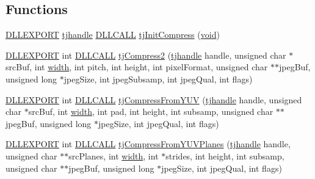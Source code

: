 \subsection*{Functions}
\begin{DoxyCompactItemize}
\item 
\hyperlink{turbojpeg_8h_a808e08638be3cba36e36759e5b150de0}{D\+L\+L\+E\+X\+P\+O\+RT} \hyperlink{group___turbo_j_p_e_g_ga758d2634ecb4949de7815cba621f5763}{tjhandle} \hyperlink{turbojpeg_8h_a54b25836118bfac94a53a7b790f3ccb2}{D\+L\+L\+C\+A\+LL} \hyperlink{group___turbo_j_p_e_g_ga3d10c47fbe4a2489a2b30c931551d01a}{tj\+Init\+Compress} (\hyperlink{png_8h_ac9c84fa68bbad002983e35ce3663c686}{void})
\item 
\hyperlink{turbojpeg_8h_a808e08638be3cba36e36759e5b150de0}{D\+L\+L\+E\+X\+P\+O\+RT} int \hyperlink{turbojpeg_8h_a54b25836118bfac94a53a7b790f3ccb2}{D\+L\+L\+C\+A\+LL} \hyperlink{group___turbo_j_p_e_g_gaba62b7a98f960839b588579898495cf2}{tj\+Compress2} (\hyperlink{group___turbo_j_p_e_g_ga758d2634ecb4949de7815cba621f5763}{tjhandle} handle, unsigned char $\ast$src\+Buf, int \hyperlink{png_8h_ad46179dbe9c68fdcea52b34c3480ec0f}{width}, int pitch, int height, int pixel\+Format, unsigned char $\ast$$\ast$jpeg\+Buf, unsigned long $\ast$jpeg\+Size, int jpeg\+Subsamp, int jpeg\+Qual, int flags)
\item 
\hyperlink{turbojpeg_8h_a808e08638be3cba36e36759e5b150de0}{D\+L\+L\+E\+X\+P\+O\+RT} int \hyperlink{turbojpeg_8h_a54b25836118bfac94a53a7b790f3ccb2}{D\+L\+L\+C\+A\+LL} \hyperlink{group___turbo_j_p_e_g_ga0b931126c7a615ddc3bbd0cca6698d67}{tj\+Compress\+From\+Y\+UV} (\hyperlink{group___turbo_j_p_e_g_ga758d2634ecb4949de7815cba621f5763}{tjhandle} handle, unsigned char $\ast$src\+Buf, int \hyperlink{png_8h_ad46179dbe9c68fdcea52b34c3480ec0f}{width}, int pad, int height, int subsamp, unsigned char $\ast$$\ast$jpeg\+Buf, unsigned long $\ast$jpeg\+Size, int jpeg\+Qual, int flags)
\item 
\hyperlink{turbojpeg_8h_a808e08638be3cba36e36759e5b150de0}{D\+L\+L\+E\+X\+P\+O\+RT} int \hyperlink{turbojpeg_8h_a54b25836118bfac94a53a7b790f3ccb2}{D\+L\+L\+C\+A\+LL} \hyperlink{group___turbo_j_p_e_g_gaa89a1982cb4556b12ae7af4439991af6}{tj\+Compress\+From\+Y\+U\+V\+Planes} (\hyperlink{group___turbo_j_p_e_g_ga758d2634ecb4949de7815cba621f5763}{tjhandle} handle, unsigned char $\ast$$\ast$src\+Planes, int \hyperlink{png_8h_ad46179dbe9c68fdcea52b34c3480ec0f}{width}, int $\ast$strides, int height, int subsamp, unsigned char $\ast$$\ast$jpeg\+Buf, unsigned long $\ast$jpeg\+Size, int jpeg\+Qual, int flags)
\item 

\end{DoxyCompactItemize}
